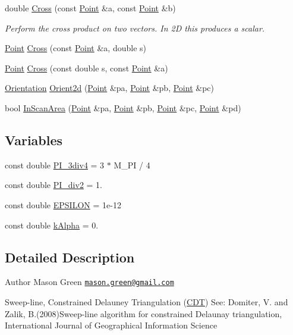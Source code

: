 \begin{DoxyCompactItemize}
double \hyperlink{namespacep2t_afc804f5616661c8a9ddb798cdeb4564e}{Cross} (const \hyperlink{structp2t_1_1_point}{Point} \&a, const \hyperlink{structp2t_1_1_point}{Point} \&b)
\begin{DoxyCompactList}\small\item\em Perform the cross product on two vectors. In 2\+D this produces a scalar. \end{DoxyCompactList}\item 
\hyperlink{structp2t_1_1_point}{Point} \hyperlink{namespacep2t_aea08cc5eefe8a698251b03beabff716a}{Cross} (const \hyperlink{structp2t_1_1_point}{Point} \&a, double s)
\item 
\hyperlink{structp2t_1_1_point}{Point} \hyperlink{namespacep2t_a4feb1c03edd4b6c664a920e540c2395e}{Cross} (const double s, const \hyperlink{structp2t_1_1_point}{Point} \&a)
\item 
\hyperlink{namespacep2t_a3ffe1d5b88773615026d5e590e3662eb}{Orientation} \hyperlink{namespacep2t_acd412577d8e78b224f040528a42bf19f}{Orient2d} (\hyperlink{structp2t_1_1_point}{Point} \&pa, \hyperlink{structp2t_1_1_point}{Point} \&pb, \hyperlink{structp2t_1_1_point}{Point} \&pc)
\item 
bool \hyperlink{namespacep2t_a6051bac23e9a0b66687571b932d88e10}{In\+Scan\+Area} (\hyperlink{structp2t_1_1_point}{Point} \&pa, \hyperlink{structp2t_1_1_point}{Point} \&pb, \hyperlink{structp2t_1_1_point}{Point} \&pc, \hyperlink{structp2t_1_1_point}{Point} \&pd)
\end{DoxyCompactItemize}
\subsection*{Variables}
\begin{DoxyCompactItemize}
\item 
const double \hyperlink{namespacep2t_a8f5d342ebd2614a9169a41fa6952b5f9}{P\+I\+\_\+3div4} = 3 $\ast$ M\+\_\+\+P\+I / 4
\item 
const double \hyperlink{namespacep2t_abd7f6949620798fa69359d45d8c46f98}{P\+I\+\_\+div2} = 1.
\item 
const double \hyperlink{namespacep2t_ac5421d160ad8cd832c3cf6483d378e24}{E\+P\+S\+I\+L\+O\+N} = 1e-\/12
\item 
const double \hyperlink{namespacep2t_aed2c5457dd827e0781c4dbfa6adfb583}{k\+Alpha} = 0.
\end{DoxyCompactItemize}


\subsection{Detailed Description}
\begin{DoxyAuthor}{Author}
Mason Green \href{mailto:mason.green@gmail.com}{\tt mason.\+green@gmail.\+com}
\end{DoxyAuthor}
Sweep-\/line, Constrained Delauney Triangulation (\hyperlink{classp2t_1_1_c_d_t}{C\+D\+T}) See\+: Domiter, V. and Zalik, B.(2008)\textquotesingle{}Sweep-\/line algorithm for constrained Delaunay triangulation\textquotesingle{}, International Journal of Geographical Information Science


